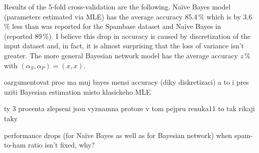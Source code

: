 \documentclass[english,cover]{fitthesis} %
\newcommand{\todo}[1]{{\color{red}#1}}
\begin{document}

Results of the 5-fold cross-validation are the following. Naïve Bayes model (parameters estimated via MLE) has the average accuracy 85.4\,\% which is by 3.6\,\% less than was reported for the Spambase dataset and Naïve Bayes in~\cite{renuka11} (reported 89\,\%). I believe this drop in accuracy is caused by discretization of the input dataset and, in fact, it is almost surprising that the loss of variance isn't greater. The more general Bayesian network model has the average accuracy \todo{$z$}\,\% with \todo{$(\alpha_S, \alpha_P) = (x,x)$}.



\todo{oargumentovat proc ma muj bayes mensi accuracy (diky diskretizaci) a to i pres uziti Bayesian estimation misto klasickeho MLE}

\todo{ty 3 procenta zlepseni jsou vyznamna protoze v tom pejpru renuka11 to tak rikaji taky}

\todo{performance drops (for Naïve Bayes as well as for Bayesian network) when spam-to-ham ratio isn't fixed, why?}
\end{document}

